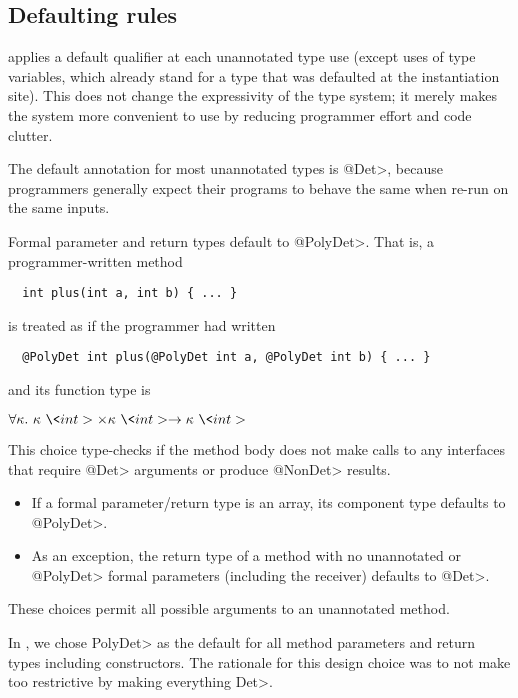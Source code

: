 \subsection{Defaulting rules}\label{defaulting}

\TheDeterminismChecker applies a default qualifier at each unannotated type
use (except uses of type variables, which already stand for a type that was
defaulted at the instantiation site).
This does not change the expressivity of the type system; it merely makes
the system more convenient to use by reducing programmer effort and code clutter.

The default annotation for most unannotated types is \<@Det>, because
programmers generally expect their programs to behave the same when re-run
on the same inputs.

Formal parameter and return types default to \<@PolyDet>.  That is, a
programmer-written method

\begin{Verbatim}
  int plus(int a, int b) { ... }
\end{Verbatim}

\noindent
is treated as if the programmer had written

\begin{Verbatim}
  @PolyDet int plus(@PolyDet int a, @PolyDet int b) { ... }
\end{Verbatim}

\noindent
and its function type is

$\forallt{\kappa}  \kappa\ \<int> \times \kappa\ \<int> \rightarrow \kappa\ \<int>$

\noindent
This choice type-checks if the method body does not make calls to any
interfaces that require \<@Det> arguments or produce \<@NonDet> results.





\begin{itemize}
\item
  If a formal parameter/return type is an array, its component type defaults to
  \<@PolyDet>.
\item
  As an exception, the return type of a method with no unannotated or
  \<@PolyDet> formal parameters (including the receiver) defaults to
  \<@Det>.
\end{itemize}

These choices permit all possible arguments to an unannotated method.

In \theDeterminismChecker, we chose \<PolyDet> as the default for all 
method parameters and return types including constructors.
The rationale for this design choice was to not make \theDeterminismChecker too restrictive by making everything \<Det>.

